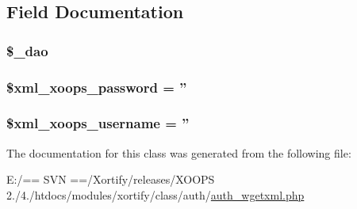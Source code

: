 \subsection{Field Documentation}
\hypertarget{class_xortify_auth_wgetxml_a12a029c610f699b4b25e79a1f64a3485}{
\subsubsection[{\$\-\_\-dao}]{\setlength{\rightskip}{0pt plus 5cm}\$\-\_\-dao}}\label{class_xortify_auth_wgetxml_a12a029c610f699b4b25e79a1f64a3485}
\hypertarget{class_xortify_auth_wgetxml_a8ec2889165c837354fded1cedbd42157}{
\subsubsection[{\$xml\-\_\-xoops\-\_\-password}]{\setlength{\rightskip}{0pt plus 5cm}\$xml\-\_\-xoops\-\_\-password = ''}}\label{class_xortify_auth_wgetxml_a8ec2889165c837354fded1cedbd42157}
\hypertarget{class_xortify_auth_wgetxml_a725df0dd6b578e15522ed15945e5901c}{
\subsubsection[{\$xml\-\_\-xoops\-\_\-username}]{\setlength{\rightskip}{0pt plus 5cm}\$xml\-\_\-xoops\-\_\-username = ''}}\label{class_xortify_auth_wgetxml_a725df0dd6b578e15522ed15945e5901c}


The documentation for this class was generated from the following file\-:\begin{DoxyCompactItemize}
\item 
E\-:/== S\-V\-N ==/\-Xortify/releases/\-X\-O\-O\-P\-S 2./4./htdocs/modules/xortify/class/auth/\hyperlink{auth__wgetxml_8php}{auth\-\_\-wgetxml.\-php}\end{DoxyCompactItemize}
